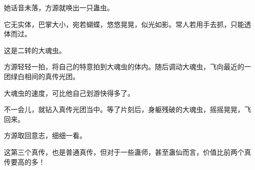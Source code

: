\begin{this_body}
她话音未落，方源就唤出一只蛊虫。

它无实体，巴掌大小，宛若蝴蝶，悠悠晃晃，似光如影。常人若用手去抓，只能透体而过。

这是二转的大魂虫。

方源轻轻一拍，将自己的特意拍到大魂虫的体内。随后调动大魂虫，飞向最近的一团绿白相间的真传光团。

大魂虫的速度，可比他自己划游快得多了。

不一会儿，就钻入真传光团当中。等了片刻后，身躯残破的大魂虫，摇摇晃晃，飞回来。

方源取回意志，细细一看。

这第三个真传，也是普通真传，但对于一些蛊师，甚至蛊仙而言，价值比前两个真传要高的多！

\end{this_body}

